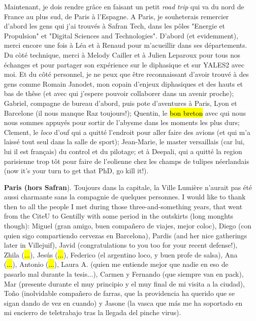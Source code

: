Maintenant, je dois rendre grâce en faisant un petit \textsl{road trip} qui va du nord de France au plus sud, de Paris à l'Espagne. A Paris, je souheterais remercier d'abord les gens qui j'ai trouvés à Safran Tech, dans les pôles "Energie et Propulsion" et "Digital Sciences and Technologies". D'abord (et evidemment), merci encore une fois à Léa et à Renaud pour m'acueillir dans ses départements. Du còté technique, merci à Melody Cailler et à Julien Leparoux pour tous nos échanges et pour partager son expérience sur le diphasique et sur YALES2 avec moi.  Et du côté personnel, je ne peux que être reconnaissant d'avoir trouvé à des gens comme Romain Janodet, mon copain d'enjeux diphasiques et des hauts et bas de thêse (et avec qui j'espere pouvoir collaborer dans un avenir proche); Gabriel, compagne de bureau d'abord, puis pote d'aventures à Paris, Lyon et Barcelone (il nous manque Raz toujours!); Quentin, le \hl{bon breton} avec qui nous nous sommes appuyés pour sortir de l'abysme dans les moments les plus durs; Clement, le \textsl{loco} d'ouf qui a quitté l'endroit pour aller faire des avions (et qui m'a laissé tout seul dans la salle de sport); Jean-Marie, le master versaillais (car lui, lui il est français) du control et du pilotage; et à Deepali, qui a quitté la region parisienne trop tôt pour faire de l'eolienne chez les champs de tulipes néerlandais (now it's your turn to get that PhD, go kill it!).
  
\textbf{Paris (hors Safran}).  Toujours dans la capitale, la Ville Lumière n'aurait pas été aussi charmante sans la compagnie de quelques personnes. I would like to thank then to all the people I met during those three-and-something years, that went from the CiteU to Gentilly with some period in the outskirts (long monghts though): Miguel (gran amigo, buen compañero de viajes, mejor coloc), Diego (con quien sigo compartiendo cervezas en Barcelona), Pardis (and her nice gatherings later in Villejuif), Javid (congratulations to you too for your recent defense!), Zhila (\hl{...}), Jesús (\hl{...}), Federico (el argentino loco, y buen profe de salsa), Ana (\hl{...}), Antonio (\hl{...}), Laura A. (quien me entiende mejor que nadie en eso de pasarlo mal durante la tesis...), Carmen y Fernando (que siempre van en pack), Mar (presente durante el muy principio y el muy final de mi visita a la ciudad), Toño (inolvidable compañero de farras, que la providencia ha querido que se sigan dando de vez en cuando) y Jasone (la vasca que más me ha soportado en mi encierro de teletrabajo tras la llegada del pinche virus).


